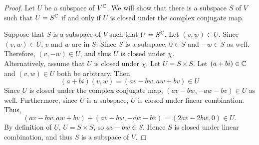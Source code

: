 \begin{proof}
Let $U$ be a subspace of $V^{\mathbb{C}}$. We will show that there is a subspace $S$ of $V$ such that $U=S^{\mathbb{C}}$ if and only if $U$ is closed under the complex conjugate map.

Suppose that $S$ is a subspace of $V$ such that $U = S^{\mathbb{C}}$. Let $(v,w)\in U$. Since $(v,w)\in U$, $v$ and $w$ are in $S$. Since $S$ is a subspace, $0\in S$ and $-w\in S$ as well. Therefore, $(v,-w)\in U$, and thus $U$ is closed under $\chi$.\\

Alternatively, assume that $U$ is closed under $\chi$. Let $U = S \times S$. Let $(a+bi)\in{\mathbb{C}}$ and $(v,w)\in U$ both be arbitrary. Then 
\[
	(a+bi)(v,w) = (av - bw, aw + bv) \in U
\]
Since $U$ is closed under the complex conjugate map, $(av - bw, -aw - bv)\in U$ as well. Furthermore, since $U$ is a subspace, $U$ is closed under linear combination. Thus,
\[
	(av - bw, aw + bv) + (av - bw, -aw - bv) = (2av - 2bw, 0) \in U.
\]
By definition of $U$, $U = S\times S$, so $av - bw\in S$. Hence $S$ is closed under linear combination, and thus $S$ is a subspace of $V$.
\end{proof}
